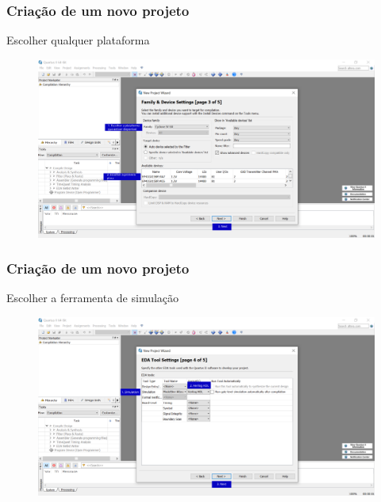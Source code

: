 \documentclass{CPSPresentation}
\begin{document}
\begin{frame}
	\frametitle{Criação de um novo projeto}
	
	\begin{block}{}
		\justifying
		Escolher qualquer plataforma
	\end{block}
	
	\begin{figure}[h]
		\centering
		\includegraphics[width=1.02\textwidth]{quartus/fig23.pdf}
	\end{figure}
	
	
\end{frame}
\begin{frame}
	\frametitle{Criação de um novo projeto}
	
	\begin{block}{}
		\justifying
		Escolher a ferramenta de simulação
	\end{block}
	
	\begin{figure}[h]
		\centering
		\includegraphics[width=1.02\textwidth]{quartus/fig24.pdf}
	\end{figure}
	
	
\end{frame}
\end{document}
